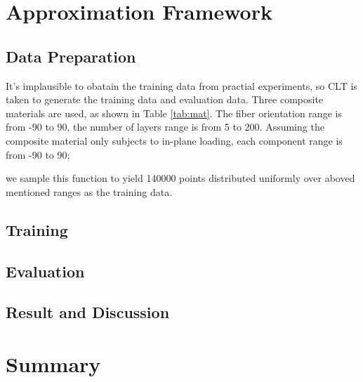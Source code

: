 \section{Approximation Framework}
\subsection{Data Preparation}

It's implausible to obatain the training data from practial experiments, so CLT
is taken to generate the training data and evaluation data. Three composite
materials are used, as shown in Table \ref{tab:mat}. The fiber orientation range
is from -90 to 90, the number of layers range is from 5 to 200. Assuming the
composite material only subjects to in-plane loading, each component range is
from -90 to 90;

we sample this function to yield 140000 points distributed uniformly over
aboved mentioned ranges as the training data.

\subsection{Training}

\subsection{Evaluation}

\subsection{Result and Discussion}
\section{Summary}

